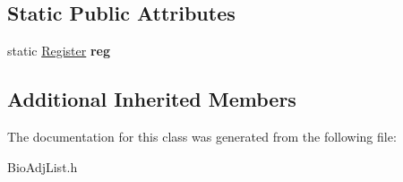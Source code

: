\subsection*{Static Public Attributes}
\begin{DoxyCompactItemize}
\item 
\mbox{\label{class_bio_adj_list_af096b5d46021f7ed9733540d6be91578}} 
static \hyperlink{struct_register}{Register} {\bfseries reg}
\end{DoxyCompactItemize}
\subsection*{Additional Inherited Members}


The documentation for this class was generated from the following file\+:\begin{DoxyCompactItemize}
\item 
Bio\+Adj\+List.\+h\end{DoxyCompactItemize}
